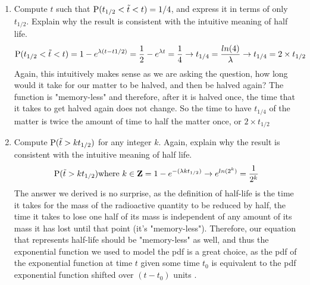 \documentclass[12pt,twoside]{article}
\begin{document}
\begin{enumerate}
\begin{enumerate}
\item Compute $t$ such that $\mathrm{P}( t_{1/2} < \tilde{ t } < t) = 1/4$, and express it in terms of only $t_{1/2}$. Explain why the result is consistent with the intuitive meaning of half life.
\subitem
$$\mathrm{P}( t_{1/2} < \tilde{ t } < t) = 1-e^{\lambda(t-t{1/2})} = \frac{1}{2} - e^{\lambda t} = \frac{1}{4} \rightarrow t_{1/4} = \frac{ln(4)}{\lambda} \rightarrow t_{1/4} = 2\times t_{1/2}$$
Again, this intuitively makes sense as we are asking the question, how long would it take for our matter to be halved, and then be halved again? The function is "memory-less" and therefore, after it is halved once, the time that it takes to get halved again does not change. So the time to have $t_{1/4}$ of the matter is twice the amount of time to half the matter once, or $2\times t_{1/2}$
\item Compute $\mathrm{P}( \tilde{ t } > k t_{1/2} )$ for any integer $k$. Again, explain why the result is consistent with the intuitive meaning of half life.
\subitem
$$
    \mathrm{P}( \tilde{ t } > k t_{1/2} ) \text{where } k \in \mathbf{Z} = 1 - e^{-(\lambda kt_{1/2})} \rightarrow e^{ln(2^k)} = \frac{1}{2^k}
$$
The answer we derived is no surprise, as the definition of half-life is the time it takes for the mass of the radioactive quantity to be reduced by half, the time it takes to lose one half of its mass is independent of any amount of its mass it has lost until that point (it's "memory-less"). Therefore, our equation that represents half-life should be "memory-less" as well, and thus the exponential function we used to model the pdf is a great choice, as the pdf of the exponential function at time $t$ given some time $t_0$ is equivalent to the pdf exponential function shifted over $(t-t_0)$ units .
\end{enumerate}


\end{enumerate}
\end{document}
